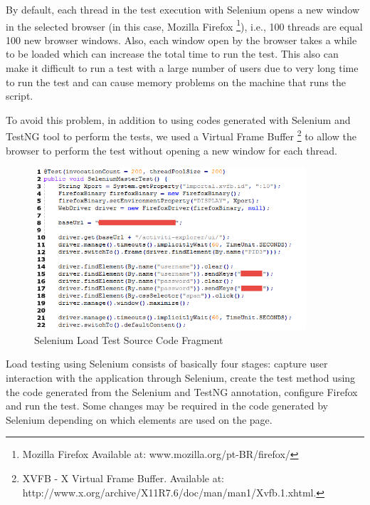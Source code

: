 \documentclass[runningheads,a4paper]{llncs}
\begin{document}
By default, each thread in the test execution with Selenium opens a new window in the selected browser (in this case, Mozilla Firefox \footnote{Mozilla Firefox Available at: www.mozilla.org/pt-BR/firefox/}), i.e., 100 threads are equal 100 new browser windows. Also, each window open by the browser takes a while to be loaded which can increase the total time to run the test. This also can make it difficult to run a test with a large number of users due to very long time to run the test and 
can cause memory problems on the machine that runs the script.


To avoid this problem, in addition to using codes generated with Selenium and TestNG tool to perform the tests, we used a Virtual Frame Buffer \footnote{XVFB - X Virtual Frame Buffer. Available at: http://www.x.org/archive/X11R7.6/doc/man/man1/Xvfb.1.xhtml.} to allow the browser to perform the test without opening a new window for each thread.

\begin{figure}[ht]
\centering
\includegraphics[width=0.9\textwidth]{figuras/codigo3.png}
\caption{Selenium Load Test Source Code Fragment}
\label{fig:codigoCargaSelenium}
\end{figure}

Load testing using Selenium consists of basically four stages: capture user interaction with the application through Selenium, create the test method using the code generated from the Selenium and TestNG annotation, configure Firefox and run the test. Some changes may be required in the code generated by Selenium depending on which elements are used on the page.
\end{document}

